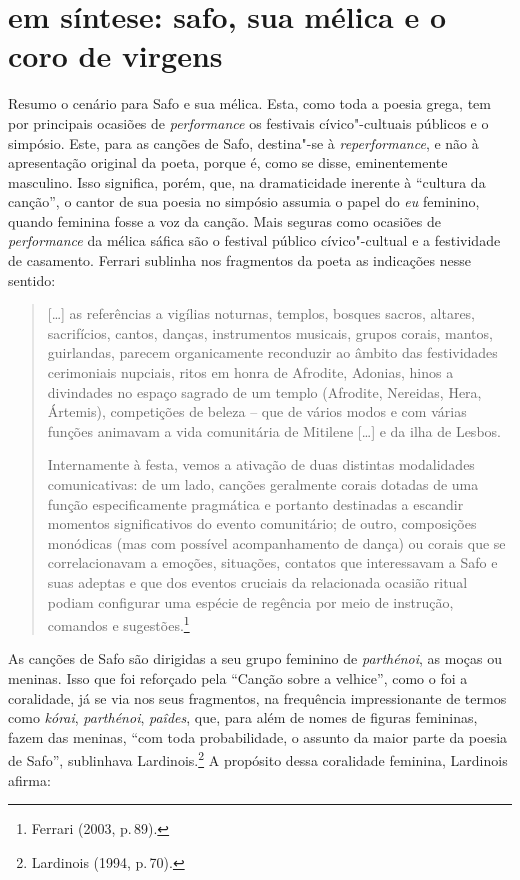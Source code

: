 \section*{em síntese: safo, sua mélica e o coro de virgens}

Resumo o cenário para Safo e sua mélica. Esta, como toda a poesia grega, tem por principais ocasiões de \textit{performance} os festivais cívico"-cultuais públicos e o simpósio. Este, para as canções de Safo, destina"-se à \textit{reperformance}, e não à apresentação original da poeta, porque é, como se disse, eminentemente masculino. Isso significa, porém, que, na dramaticidade inerente à “cultura da canção”, o cantor de sua poesia no simpósio assumia o papel do \textit{eu} feminino, quando feminina fosse a voz da canção. Mais seguras como ocasiões de \textit{performance} da mélica sáfica são o festival público cívico"-cultual e a festividade de casamento. Ferrari sublinha nos fragmentos da poeta as indicações nesse sentido: 

\begin{quote}
[\ldots{}] as referências a vigílias noturnas, templos, bosques sacros, altares, sacrifícios, cantos, danças, instrumentos musicais, grupos corais, mantos, guirlandas, parecem organicamente reconduzir ao âmbito das festividades cerimoniais nupciais, ritos em honra de Afrodite, Adonias, hinos a divindades no espaço sagrado de um templo (Afrodite, Nereidas, Hera, Ártemis), competições de beleza -- que de vários modos e com várias funções animavam a vida comunitária de Mitilene [\ldots{}] e da ilha de Lesbos.
	
Internamente à festa, vemos a ativação de duas distintas modalidades comunicativas: de um lado, canções geralmente corais dotadas de uma função especificamente pragmática e portanto destinadas a escandir momentos significativos do evento comunitário; de outro, composições monódicas (mas com possível acompanhamento de dança) ou corais que se correlacionavam a emoções, situações, contatos que interessavam a Safo e suas adeptas e que dos eventos cruciais da relacionada ocasião ritual podiam configurar uma espécie de regência por meio de instrução, comandos e sugestões.\footnote{Ferrari (2003, p.\,89).}
\end{quote}

As canções de Safo são dirigidas a seu grupo feminino de \textit{parthénoi}, as moças ou meninas. Isso que foi reforçado pela “Canção sobre a velhice”, como o foi a coralidade, já se via nos seus fragmentos, na frequência impressionante de termos como \textit{kórai}, \textit{parthénoi}, \textit{paîdes}, que, para além de nomes de figuras femininas, fazem das meninas, “com toda probabilidade, o assunto da maior parte da poesia de Safo”, sublinhava Lardinois.\footnote{Lardinois (1994, p.\,70).} A propósito dessa coralidade feminina, Lardinois afirma:

